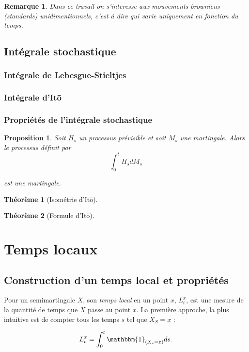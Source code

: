 \documentclass[openany]{book}
\newcommand{\1}{\mathbbm{1}}
\theoremstyle{thmfont}
\newtheorem{theorem}{Théorème}[chapter]
\theoremstyle{deffont}
\theoremstyle{thmfont}
\newtheorem{prop}[prop]{Proposition}
\theoremstyle{deffont}
\newtheorem*{remark}{Remarque}
\begin{document}
\begin{remark}
  Dans ce travail on s'interesse aux mouvements browniens (standards) unidimentionnels, c'est à dire qui varie uniquement en fonction du temps. 
\end{remark}


\section{Intégrale stochastique}  
\subsection{Intégrale de Lebesgue-Stieltjes}
\subsection{Intégrale d'Itō}
\subsection{Propriétés de l'intégrale stochastique}
{\color{red}
\begin{prop}
  Soit $H_s$ un processus prévisible et soit $M_s$ une martingale. Alors le processus définit par 
  $$\int_0^t H_s dM_s$$

  est une martingale.
\end{prop}
}

{\color{red}
\begin{theorem}[Isométrie d'Itō]
      \label{thm:IsometrieIto}
\end{theorem}

\begin{theorem}[Formule d'Itō]
  \label{thm:FormuleIto}
\end{theorem}
}

\chapter{Temps locaux}
\section{Construction d'un temps local et propriétés}\label{sec:ConstrTempsLoc}

Pour un semimartingale $X$, son \textit{temps local} en un point $x$, $L_t^x$, est une mesure de la quantité de temps que $X$ passe au point $x$. La première approche, la plus intuitive est de compter tous les temps $s$ tel que $X_S = x$ :

\begin{equation}
  \label{eq:TmpsLocalDef1}
   L^x_t= \int_0^t\1_{(X_s=x)}ds.
  \end{equation}
\end{document}
